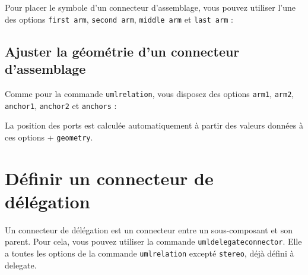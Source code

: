 \documentclass[a4paper,11pt]{report}
\newcommand{\inputTikZ}[1]{%
  }%
\newcommand{\inputTikZ}[1]{%
    \texttt{[image: fig/\#1.pdf]}%
  }%
\begin{document}
Pour placer le symbole d'un connecteur d'assemblage, vous pouvez utiliser l'une des options {\tt first arm}, {\tt second arm}, {\tt middle arm} et {\tt last arm} :

\medskip

\begin{minipage}{0.45\textwidth}

\end{minipage}
\begin{minipage}{0.55\textwidth}
\begin{center}
\inputTikZ{componentassemblyconnectorarm}
\end{center}
\end{minipage}

\subsection{Ajuster la géométrie d'un connecteur d'assemblage}

Comme pour la commande {\tt umlrelation}, vous disposez des options {\tt arm1}, {\tt arm2}, {\tt anchor1}, {\tt anchor2} et {\tt anchors} :

\medskip

\begin{minipage}{0.45\textwidth}

\end{minipage}
\begin{minipage}{0.55\textwidth}
\begin{center}
\inputTikZ{componentassemblyconnectoradjust}
\end{center}
\end{minipage}

\medskip

La position des ports est calculée automatiquement à partir des valeurs données à ces options + {\tt geometry}.

\section{Définir un connecteur de délégation}

Un connecteur de délégation est un connecteur entre un sous-composant et son parent. Pour cela, vous pouvez utiliser la commande {\tt umldelegateconnector}. Elle a toutes les options de la commande {\tt umlrelation} excepté {\tt stereo}, déjà défini à delegate.

\medskip

\begin{minipage}{0.45\textwidth}

\end{minipage}
\begin{minipage}{0.55\textwidth}
\begin{center}
\inputTikZ{componentdelegateconnector}
\end{center}
\end{minipage}
\end{document}
